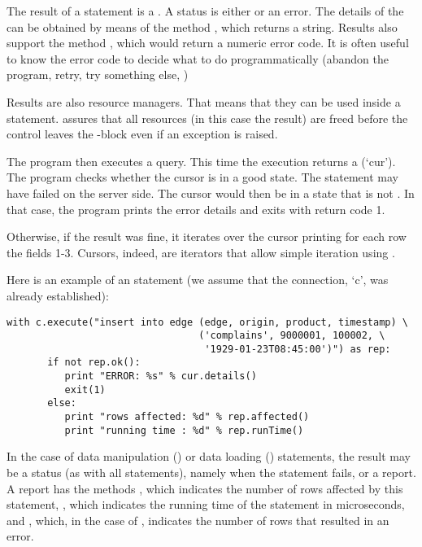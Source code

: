 The result of a  statement is a .
A status is either  or an error.
The details of the can be obtained by means of the method
, which returns a string.
Results also support the method ,
which would return a numeric error code.
It is often useful to know the error code to decide
what to do programmatically (abandon the program,
retry, try something else, \etc)

Results are also resource managers. That means
that they can be used inside a  statement.
 assures that all resources (in this case
the result) are freed before the control leaves
the -block even if an exception is raised.

The program then executes a query.
This time the execution returns a  (`cur').
The program checks whether the cursor is
in a good state. The statement may have
failed on the server side. The cursor would
then be in a state that is not .
In that case, the program prints the error details
and exits with return code 1.

Otherwise, if the result was fine,
it iterates over the cursor
printing for each row the fields 1-3.
Cursors, indeed, are iterators
that allow simple iteration using .

Here is an example of an  statement
(we assume that the connection, `c', was already established):

\begin{python}
\begin{lstlisting}
with c.execute("insert into edge (edge, origin, product, timestamp) \
                                 ('complains', 9000001, 100002, \
                                  '1929-01-23T08:45:00')") as rep:
       if not rep.ok():
          print "ERROR: %s" % cur.details()
          exit(1)
       else:
          print "rows affected: %d" % rep.affected()
          print "running time : %d" % rep.runTime()
\end{lstlisting}
\end{python}

In the case of data manipulation ()
or data loading () statements,
the result may be a status (as with all statements),
namely when the statement fails,
or a report.
A report has the methods ,
which indicates the number of rows affected by this statement,
\term{runTime()},
which indicates the running time of the statement in microseconds,
and ,
which, in the case of \term{load},
indicates the number of rows that resulted in an error.

